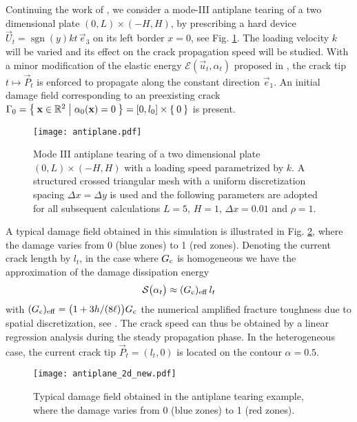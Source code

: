 Continuing the work of \cite{Bourdin:2011}, we consider a mode-\RN{3} antiplane tearing of a two dimensional plate $(0,L)\times(-H,H)$, by prescribing a hard device $\vec{U}_t=\operatorname{sgn}(y)kt\,\vec{e}_3$ on its left border $x=0$, see Fig. \ref{fig:antiplane}. The loading velocity $k$ will be varied and its effect on the crack propagation speed will be studied. With a minor modification of the elastic energy $\mathcal{E}(\vec{u}_t,\alpha_t)$ proposed in \cite{Bourdin:2011}, the crack tip $t\mapsto\vec{P}_t$ is enforced to propagate along the constant direction $\vec{e}_1$. An initial damage field corresponding to an preexisting crack $\Gamma_0=\set{\vec{x}\in\mathbb{R}^2|\alpha_0(\vec{x})=0}=[0,l_0]\times\set{0}$ is present.
\begin{figure}[htbp]
\centering
\texttt{[image: antiplane.pdf]}
\caption{Mode III antiplane tearing of a two dimensional plate $(0,L)\times(-H,H)$ with a loading speed parametrized by $k$. A structured crossed triangular mesh with a uniform discretization spacing $\Delta x=\Delta y$ is used and the following parameters are adopted for all subsequent calculations $L=5$, $H=1$, $\Delta x=0.01$ and $\rho=1$.} \label{fig:antiplane}
\end{figure}

A typical damage field obtained in this simulation is illustrated in Fig. \ref{fig:antiplane_2d_new}, where the damage varies from 0 (blue zones) to 1 (red zones). Denoting the current crack length by $l_t$, in the case where $G_\mathrm{c}$ is homogeneous we have the approximation of the damage dissipation energy
\begin{equation} \label{eq:ltapprox}
\mathcal{S}\bigl(\alpha_t\bigr)\approx(G_\mathrm{c})_\mathrm{eff}\,l_t
\end{equation}
with $(G_\mathrm{c})_\mathrm{eff}=\bigl(1+3h/(8\ell)\bigr)G_\mathrm{c}$ the numerical amplified fracture toughness due to spatial discretization, see \cite{BourdinFrancfortMarigo:2008}. The crack speed can thus be obtained by a linear regression analysis during the steady propagation phase. In the heterogeneous case, the current crack tip $\vec{P}_t=(l_t,0)$ is located on the contour $\alpha=0.5$.
\begin{figure}[htbp]
\centering
\texttt{[image: antiplane\_2d\_new.pdf]}
\caption{Typical damage field obtained in the antiplane tearing example, where the damage varies from 0 (blue zones) to 1 (red zones).} \label{fig:antiplane_2d_new}
\end{figure}

